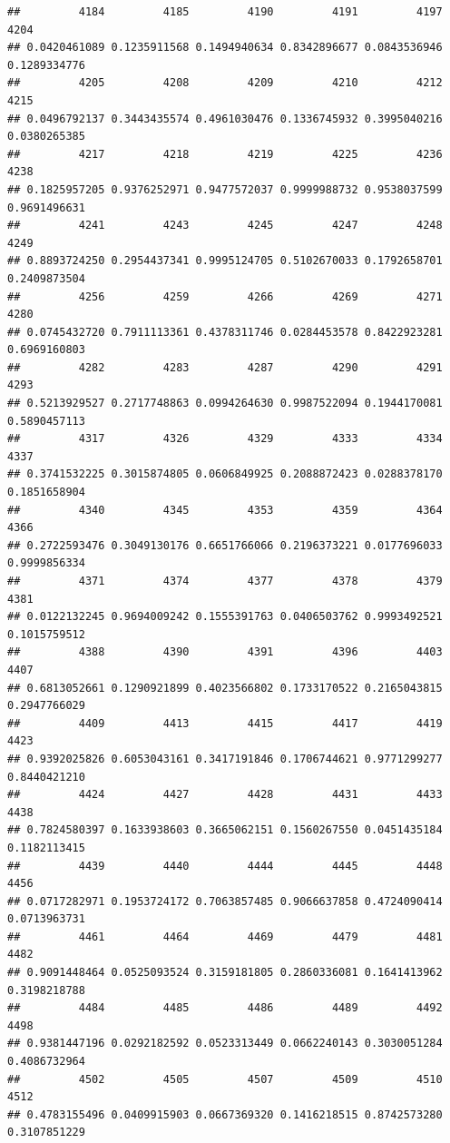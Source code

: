 \documentclass[
]{article}
\begin{document}
\begin{verbatim}
##         4184         4185         4190         4191         4197         4204 
## 0.0420461089 0.1235911568 0.1494940634 0.8342896677 0.0843536946 0.1289334776 
##         4205         4208         4209         4210         4212         4215 
## 0.0496792137 0.3443435574 0.4961030476 0.1336745932 0.3995040216 0.0380265385 
##         4217         4218         4219         4225         4236         4238 
## 0.1825957205 0.9376252971 0.9477572037 0.9999988732 0.9538037599 0.9691496631 
##         4241         4243         4245         4247         4248         4249 
## 0.8893724250 0.2954437341 0.9995124705 0.5102670033 0.1792658701 0.2409873504 
##         4256         4259         4266         4269         4271         4280 
## 0.0745432720 0.7911113361 0.4378311746 0.0284453578 0.8422923281 0.6969160803 
##         4282         4283         4287         4290         4291         4293 
## 0.5213929527 0.2717748863 0.0994264630 0.9987522094 0.1944170081 0.5890457113 
##         4317         4326         4329         4333         4334         4337 
## 0.3741532225 0.3015874805 0.0606849925 0.2088872423 0.0288378170 0.1851658904 
##         4340         4345         4353         4359         4364         4366 
## 0.2722593476 0.3049130176 0.6651766066 0.2196373221 0.0177696033 0.9999856334 
##         4371         4374         4377         4378         4379         4381 
## 0.0122132245 0.9694009242 0.1555391763 0.0406503762 0.9993492521 0.1015759512 
##         4388         4390         4391         4396         4403         4407 
## 0.6813052661 0.1290921899 0.4023566802 0.1733170522 0.2165043815 0.2947766029 
##         4409         4413         4415         4417         4419         4423 
## 0.9392025826 0.6053043161 0.3417191846 0.1706744621 0.9771299277 0.8440421210 
##         4424         4427         4428         4431         4433         4438 
## 0.7824580397 0.1633938603 0.3665062151 0.1560267550 0.0451435184 0.1182113415 
##         4439         4440         4444         4445         4448         4456 
## 0.0717282971 0.1953724172 0.7063857485 0.9066637858 0.4724090414 0.0713963731 
##         4461         4464         4469         4479         4481         4482 
## 0.9091448464 0.0525093524 0.3159181805 0.2860336081 0.1641413962 0.3198218788 
##         4484         4485         4486         4489         4492         4498 
## 0.9381447196 0.0292182592 0.0523313449 0.0662240143 0.3030051284 0.4086732964 
##         4502         4505         4507         4509         4510         4512 
## 0.4783155496 0.0409915903 0.0667369320 0.1416218515 0.8742573280 0.3107851229 

\end{verbatim}
\end{document}
